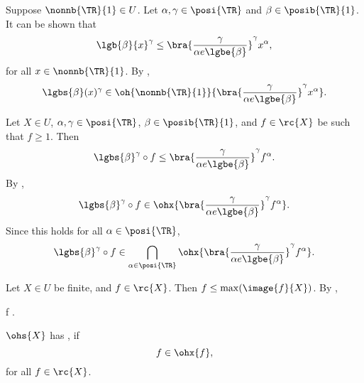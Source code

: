 \documentclass[b5paper, english, oneside]{memoir}
\begin{document}
\begin{example}
\label{LogGrowsSlowly}
Suppose $\nonnb{\TR}{1} \in U$. Let $\alpha, \gamma \in \posi{\TR}$ and $\beta \in \posib{\TR}{1}$. It can be shown that
\begin{equation}
\lgb{\beta}{x}^{\gamma} \leq \bra{\frac{\gamma}{\alpha e \lgbe{\beta}}}^{\gamma} x^{\alpha},
\end{equation}
for all $x \in \nonnb{\TR}{1}$. By ,
\begin{equation}
\lgbs{\beta}(x)^{\gamma} \in \oh{\nonnb{\TR}{1}}{\bra{\frac{\gamma}{\alpha e \lgbe{\beta}}}^{\gamma} x^{\alpha}}.
\end{equation}
\end{example}

\begin{example}
\label{LogGrowsSlowlyGeneralized}
Let $X \in U$, $\alpha, \gamma \in \posi{\TR}$, $\beta \in \posib{\TR}{1}$, and $f \in \rc{X}$ be such that $f \geq 1$. Then
\begin{equation}
\lgbs{\beta}^{\gamma} \circ f \leq \bra{\frac{\gamma}{\alpha e \lgbe{\beta}}}^{\gamma} f^{\alpha}.
\end{equation}
By , 
\begin{equation}
\lgbs{\beta}^{\gamma} \circ f \in \ohx{\bra{\frac{\gamma}{\alpha e \lgbe{\beta}}}^{\gamma} f^{\alpha}}.
\end{equation}
Since this holds for all $\alpha \in \posi{\TR}$,
\begin{equation}
\lgbs{\beta}^{\gamma} \circ f \in \bigcap_{\alpha \in \posi{\TR}} \ohx{\bra{\frac{\gamma}{\alpha e \lgbe{\beta}}}^{\gamma} f^{\alpha}}.
\end{equation}
\end{example}

\begin{example}
\label{FunctionsInFiniteSet}
Let $X \in U$ be finite, and $f \in \rc{X}$. Then $f \leq \max(\image{f}{X})$. By ,
\begin{eqs}
f \in {}.
\end{eqs}
\end{example}

\begin{definition}
$\ohs{X}$ has , if 
\begin{equation}
f \in \ohx{f},
\end{equation} 
for all $f \in \rc{X}$. 
\end{definition}
\end{document}
